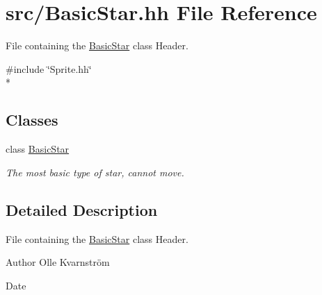 \hypertarget{BasicStar_8hh}{\section{src/\-Basic\-Star.hh File Reference}
\label{BasicStar_8hh}
}


File containing the \hyperlink{classBasicStar}{Basic\-Star} class Header.  


{\ttfamily \#include \char`\"{}Sprite.\-hh\char`\"{}}\\*
\subsection*{Classes}
\begin{DoxyCompactItemize}
\item 
class \hyperlink{classBasicStar}{Basic\-Star}
\begin{DoxyCompactList}\small\item\em The most basic type of star, cannot move. \end{DoxyCompactList}\end{DoxyCompactItemize}


\subsection{Detailed Description}
File containing the \hyperlink{classBasicStar}{Basic\-Star} class Header. \begin{DoxyAuthor}{Author}
Olle Kvarnström 
\end{DoxyAuthor}
\begin{DoxyDate}{Date}

\end{DoxyDate}
